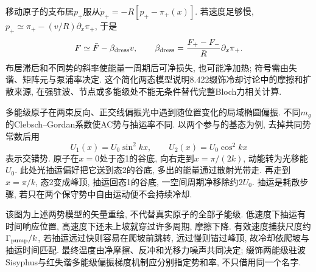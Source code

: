 移动原子的支布居$p_+$服从$\dot p_+=-R[p_+-\pi_+(x)]$. 若速度足够慢, $p_+\simeq\pi_+-(v/R)\partial_x\pi_+$, 于是
\[F\simeq\bar F-\beta_{\rm dress}v,\qquad
 \beta_{\rm dress}=\frac{F_+-F_-}{R}\partial_x\pi_+.\]
布居滞后和不同势的斜率使能量一周期后可净损失, 也可能净加热; 符号需由失谐、矩阵元与泵浦率决定. 这个简化两态模型说明8.422缀饰冷却讨论中的摩擦和扩散来源, 在强驻波、节点或多能级处不能无条件替代完整Bloch力相关计算.

多能级原子在两束反向、正交线偏振光中遇到随位置变化的局域椭圆偏振. 不同$m_g$的Clebsch--Gordan系数使AC势与抽运率不同. 以两个参与的基态为例, 去掉共同势常数后用
\[U_1(x)=U_0\sin^2kx,\qquad U_2(x)=U_0\cos^2kx\]
表示交错势. 原子在$x=0$处于态1的谷底, 向右走到$x=\pi/(2k)$, 动能转为光移能$U_0$. 此处光抽运偏好把它送到态2的谷底, 多出的能量通过散射光带走. 再走到$x=\pi/k$, 态2变成峰顶, 抽运回态1的谷底, 一空间周期净移除约$2U_0$. 抽运是耗散步骤, 若只在两个保守势中自由运动便不会持续冷却.

\begin{center}\end{center}
该图为上述两势模型的矢量重绘, 不代替真实原子的全部子能级. 低速度下抽运有时间响应位置, 高速度下还未上坡就穿过许多周期, 摩擦下降. 有效速度捕获尺度约$\Gamma_{\rm pump}/k$, 若抽运远过快则容易在爬坡前跳转, 远过慢则错过峰顶, 故冷却依爬坡与抽运时间匹配. 最终温度由净摩擦、反冲和光移力噪声共同决定; 缀饰两能级驻波Sisyphus与红失谐多能级偏振梯度机制应分别指定势和率, 不只借用同一个名字.
